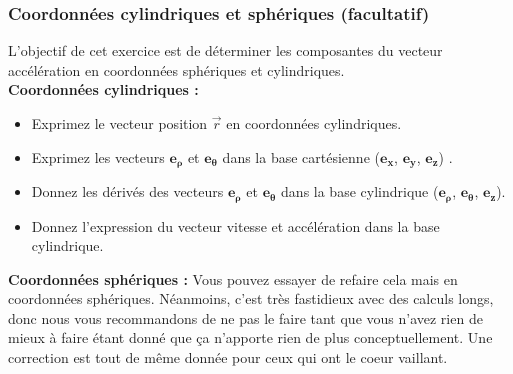 \documentclass[a4paper,10pt,twoside]{article}
\begin{document}
 
 
 
\subsubsection{Coordonnées cylindriques et sphériques (facultatif)}

\noindent L'objectif de cet exercice est de déterminer les composantes du vecteur accélération en coordonnées sphériques et cylindriques. \\
\textbf{Coordonnées cylindriques : }
\begin{itemize}
    \item Exprimez le vecteur position $\vec r$ en coordonnées cylindriques.
    \item Exprimez les  vecteurs $\mathbf{ e_\rho}$ et  $\mathbf{ e_\theta}$ dans la base cartésienne ($\mathbf{ e_x}$, $\mathbf{ e_y}$, $\mathbf{ e_z}$) .
    \item Donnez les dérivés des vecteurs $\mathbf{ e_\rho}$ et  $\mathbf{ e_\theta}$ dans la base cylindrique ($\mathbf{ e_\rho}$, $\mathbf{ e_\theta}$, $ \mathbf{e_z}$).
    \item Donnez l'expression du vecteur vitesse et accélération dans la base cylindrique.
\end{itemize} 
\textbf{Coordonnées sphériques :} Vous pouvez essayer de refaire cela mais en coordonnées sphériques. Néanmoins, c'est très fastidieux avec des calculs longs, donc nous vous recommandons de ne pas le faire tant que vous n'avez rien de mieux à faire étant donné que ça n'apporte rien de plus conceptuellement. Une correction est tout de même donnée pour ceux qui ont le coeur vaillant. 
\end{document}
